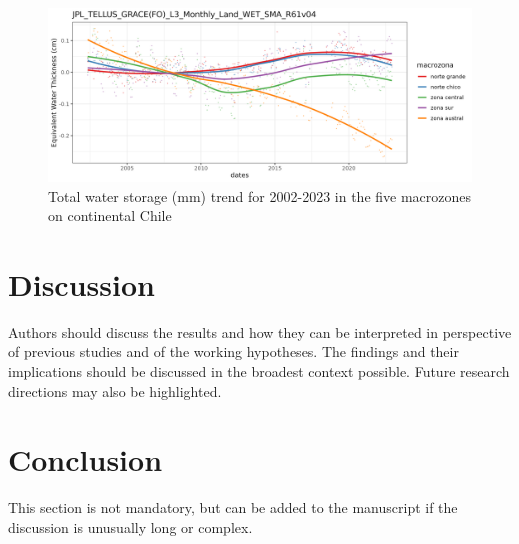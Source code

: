 \documentclass[preprint,
3p]{elsarticle} %
\begin{document}
\begin{figure}[!ht]
\centering
\includegraphics[width=\textwidth]{../output/figs/JPL_TELLUS_GRACE-FO_L3_Monthly_Land_WET_SMA_R61v04_macrozonas.png}
\caption{Total water storage (mm) trend for 2002-2023 in the five macrozones on continental Chile}
\end{figure}

\hypertarget{discussion}{%
\section{Discussion}\label{discussion}}

Authors should discuss the results and how they can be interpreted in
perspective of previous studies and of the working hypotheses. The
findings and their implications should be discussed in the broadest
context possible. Future research directions may also be highlighted.

\hypertarget{conclusion}{%
\section{Conclusion}\label{conclusion}}

This section is not mandatory, but can be added to the manuscript if the
discussion is unusually long or complex.

\renewcommand\refname{References}

\end{document}
